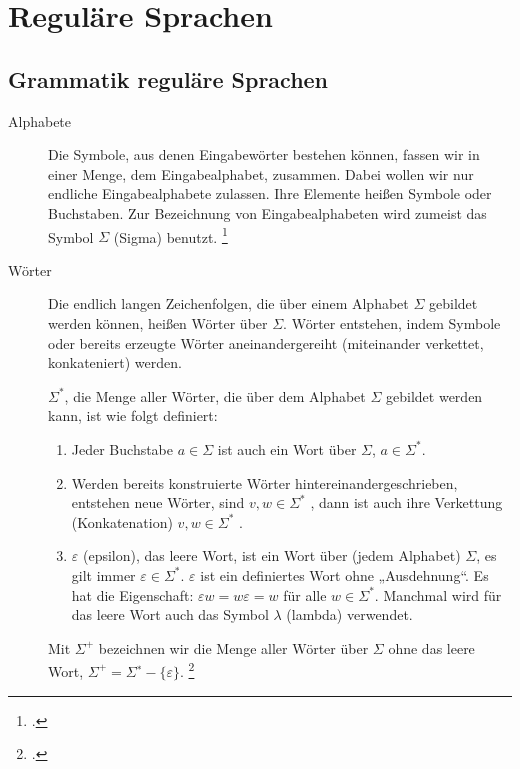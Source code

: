\documentclass{lehramt-informatik-haupt}
\begin{document}

\chapter{Reguläre Sprachen}

%

\section{Grammatik reguläre Sprachen}

\begin{description}
\item[Alphabete]

Die Symbole, aus denen Eingabewörter bestehen können, fassen wir in
einer Menge, dem Eingabealphabet, zusammen. Dabei wollen wir nur
endliche Eingabealphabete zulassen. Ihre Elemente heißen Symbole oder
Buchstaben. Zur Bezeichnung von Eingabealphabeten wird zumeist das
Symbol $\Sigma$ (Sigma) benutzt.
\footcite[Seite 15]{vossen}

\item[Wörter]
Die endlich langen Zeichenfolgen, die über einem Alphabet $\Sigma$
gebildet werden können, heißen Wörter über $\Sigma$. Wörter entstehen,
indem Symbole oder bereits erzeugte Wörter aneinandergereiht
(miteinander verkettet, konkateniert) werden.

$\Sigma^*$, die Menge aller Wörter, die über dem Alphabet $\Sigma$
gebildet werden kann, ist wie folgt definiert:

\begin{enumerate}
\item Jeder Buchstabe $a \in \Sigma$ ist auch ein Wort über $\Sigma$,
\dh $a \in \Sigma^*$.

\item Werden bereits konstruierte Wörter hintereinandergeschrieben,
entstehen neue Wörter, \dh sind $v, w \in Σ^*$ , dann ist auch ihre
Verkettung (Konkatenation) $v, w \in Σ^*$ .

\item $\varepsilon$ (epsilon), das leere Wort, ist ein Wort über (jedem
Alphabet) $\Sigma$, \dh es gilt immer $\varepsilon \in Σ^*$. $\varepsilon$
ist ein definiertes Wort ohne „Ausdehnung“. Es hat die Eigenschaft:
$\varepsilon w = w \varepsilon = w$ für alle $w \in Σ^*$. Manchmal wird für
das leere Wort auch das Symbol $\lambda$ (lambda) verwendet.
\end{enumerate}

Mit $\Sigma^+$ bezeichnen wir die Menge aller Wörter über $\Sigma$ ohne
das leere Wort, \dh $\Sigma^+ = \Sigma^∗ - \{ \varepsilon \}$.
\footcite[Seite 16]{vossen}
\end{description}
\end{document}
